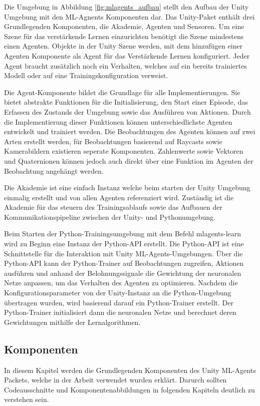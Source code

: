 Die Umgebung in Abbildung \ref{fig:mlagents_aufbau} stellt den Aufbau der Unity Umgebung mit den ML-Agnents Komponenten dar. Das Unity-Paket enthält drei Grundlegenden Komponenten, die Akademie, Agenten und Sensoren. Um eine Szene für das verstärkende Lernen einzurichten benötigt die Szene mindestens einen Agenten. Objekte in der Unity Szene werden, mit dem hinzufügen einer Agenten Komponente als Agent für das Verstärkende Lernen konfiguriert. Jeder Agent braucht zusätzlich noch ein Verhalten, welches auf ein bereits trainiertes Modell oder auf eine Trainingskonfiguration verweist.

Die Agent-Komponente bildet die Grundlage für alle Implementierungen. Sie bietet abstrakte Funktionen für die Initialisierung, den Start einer Episode, das Erfassen des Zustands der Umgebung sowie das Ausführen von Aktionen. Durch die Implementierung dieser Funktionen können unterschiedlichste Agenten entwickelt und trainiert werden. Die Beobachtungen des Agenten können auf zwei Arten erstellt werden, für Beobachtungen basierend auf Raycasts sowie Kamerabildern existieren seperate Komponenten. Zahlenwerte sowie Vektoren und Quaternionen können jedoch auch direkt über eine Funktion im Agenten der Beobachtung angehängt werden.

Die Akademie ist eine einfach Instanz welche beim starten der Unity Umgebung einmalig erstellt und von allen Agenten referenziert wird. Zuständig ist die Akademie für das steuern des Trainingsablaufs sowie das Aufbauen der Kommunikationspipeline zwischen der Unity- und Pythonumgebung.\cite{juliani2020}

Beim Starten der Python-Trainingsumgebung mit dem Befehl mlagents-learn wird zu Beginn eine Instanz der Python-API erstellt. Die Python-API ist eine Schnittstelle für die Interaktion mit Unity ML-Agents-Umgebungen. Über die Python-API kann der Python-Trainer auf Beobachtungen zugreifen, Aktionen ausführen und anhand der Belohnungssignale die Gewichtung der neuronalen Netze anpassen, um das Verhalten des Agenten zu optimieren. Nachdem die Konfigurationsparameter von der Unity-Instanz an die Python-Umgebung übertragen wurden, wird basierend darauf ein Python-Trainer erstellt. Der Python-Trainer initialisiert dann die neuronalen Netze und berechnet deren Gewichtungen mithilfe der Lernalgorithmen.

\subsection{Komponenten}
In diesem Kapitel werden die Grundlegenden Komponenten des Unity ML-Agents Packets, welche in der Arbeit verwendet wurden erklärt. Darurch sollten Codeausschnitte und Komponentenabbildungen in folgenden Kapiteln deutlich zu verstehen sein.


